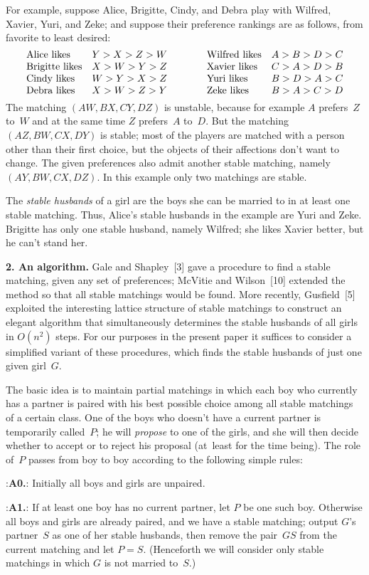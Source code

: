 For example, suppose Alice, Brigitte, Cindy, and Debra play with Wilfred,
Xavier, Yuri, and Zeke; and suppose their preference rankings are as follows,
from favorite to least desired:
$$\vcenter{\halign{#\hfil\quad&$#$\hfil\qquad\qquad
&#\hfil\quad&$#$\hfil\cr
Alice likes&Y>X>Z>W&Wilfred likes&A>B>D>C\cr
Brigitte likes&X>W>Y>Z&Xavier likes&C>A>D>B\cr
Cindy likes&W>Y>X>Z&Yuri likes&B>D>A>C\cr
Debra likes&X>W>Z>Y&Zeke likes&B>A>C>D\cr
}}$$
The matching $(AW,BX,CY,DZ)$ is unstable, because for example
$A$ prefers~$Z$ to~$W$ and at the same time $Z$ prefers~$A$ to~$D$.
But the matching $(AZ,BW,CX,DY)$ is stable; most of the players 
are matched with a person other than their
first choice, but the objects of their affections don't want to change.
The given preferences also admit another stable matching, namely
$(AY,BW,CX,DZ)$. In this example only two matchings are stable.

The {\it stable husbands\/} of a girl are the boys she can be married to
in at least one stable matching. Thus, Alice's stable husbands in the
example are Yuri and Zeke. Brigitte has only one stable husband, namely
Wilfred; she likes Xavier better, but he can't stand her.

\vfill\eject

\noindent
{\bf 2. An algorithm.}\enspace
Gale and Shapley~[3]
gave a procedure to find a stable matching, given any set of preferences;
McVitie and Wilson~[10]
extended the method so that all stable matchings would be found. 
More recently, Gusfield~[5]
exploited the interesting lattice structure of stable matchings to
construct an elegant algorithm that simultaneously determines
the stable husbands of all girls in $O(n^2)$ steps. For our
purposes in the present paper
it suffices to consider a simplified variant of these
procedures, which finds the stable husbands of just one given girl~$G$.

The basic idea is to maintain partial matchings in which each boy who
currently has a partner is paired with his best possible choice among all
stable matchings of a certain class. 
One of the boys who doesn't have a current partner is temporarily called~$P$;
he will {\it propose\/} to one of the girls, and she will then decide whether
to accept or to reject his proposal (at~least for the time being).
The  role 
of~$P$ passes from boy to boy according to the following simple rules:

\medskip
\display 30pt:{\bf A0.}:
Initially all boys and girls are unpaired.

\display 30pt:{\bf A1.}:
If at least one boy has no current partner, let $P$ be one such boy.
Otherwise all boys and girls are already paired, and we have
a stable matching; output $G$'s partner~$S$ as one of her stable husbands,
then remove the pair~$GS$ from the current matching 
and let $P=S$. (Henceforth we will consider only stable matchings in
which $G$ is not married to~$S$.)

